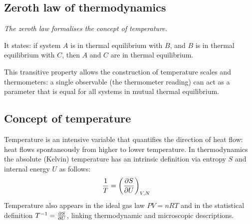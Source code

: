 	\subsection{Zeroth law of thermodynamics}
		\emph{The zeroth law formalises the concept of temperature.}
		
		It states: if system $A$ is in thermal equilibrium with $B$, and $B$ is in thermal equilibrium with $C$, then $A$ and $C$ are in thermal equilibrium. 
		
		This transitive property allows the construction of temperature scales and thermometers: a single observable (the thermometer reading) can act as a parameter that is equal for all systems in mutual thermal equilibrium.
		
	\subsection{Concept of temperature}
		Temperature is an intensive variable that quantifies the direction of heat flow: heat flows spontaneously from higher to lower temperature. In thermodynamics the absolute (Kelvin) temperature has an intrinsic definition via entropy $S$ and internal energy $U$ as follows:
		\begin{align*}
			\dfrac{1}{T}&=\qty(\pdv{S}{U})_{V,N}
		\end{align*}
		Temperature also appears in the ideal gas law $PV=nRT$ and in the statistical definition $T^{-1}=\pdv{S}{U}$, linking thermodynamic and microscopic descriptions.